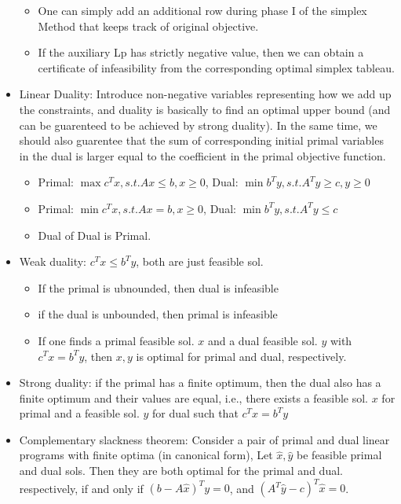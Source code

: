 \documentclass{article}
\begin{document}
\begin{itemize}
\begin{itemize}
\item One can simply add an additional row during phase I of the simplex Method that keeps track of original objective.
\item If the auxiliary Lp has strictly negative value, then we can obtain a certificate of infeasibility from the corresponding optimal simplex tableau.
\end{itemize}
\item Linear Duality: Introduce non-negative variables representing how we add up the constraints, and duality is basically to find an optimal upper bound (and can be guarenteed to be achieved by strong duality). In the same time, we should also guarentee that the sum of corresponding initial primal variables in the dual is larger equal to the coefficient in the primal objective function.
\begin{itemize}
\item Primal: $\max c^Tx, s.t. Ax\leq b, x\geq 0$, Dual: $\min b^Ty, s.t. A^Ty\geq c, y\geq 0$
\item Primal: $\min c^Tx, s.t. Ax=b, x\geq 0$, Dual: $\min b^Ty, s.t. A^Ty\leq c$
\item Dual of Dual is Primal.
\end{itemize}
\item Weak duality: $c^Tx\leq b^Ty$, both are just feasible sol.
\begin{itemize}
\item If the primal is ubnounded, then dual is infeasible
\item if the dual is unbounded, then primal is infeasible
\item If one finds a primal feasible sol. $x$ and a dual feasible sol. $y$ with $c^Tx=b^Ty$, then $x,y$ is optimal for primal and dual, respectively.
\end{itemize}
\item Strong duality: if the primal has a finite optimum, then the dual also has a finite optimum and their values are equal, i.e., there exists a feasible sol. $x$ for primal and a feasible sol. $y$ for dual such that $c^Tx=b^Ty$
\item Complementary slackness theorem: Consider a pair of primal and dual linear programs with finite optima (in canonical form), Let $\hat{x}, \hat{y}$ be feasible primal and dual sols. Then they are both optimal for the primal and dual. respectively, if and only if $(b-A\hat{x})^Ty=0$, and $(A^T\hat{y}-c)^T\hat{x}=0$. 
\end{itemize}
\end{document}
